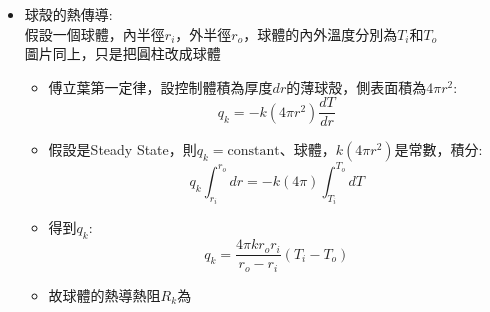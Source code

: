 \documentclass[../main.tex]{subfiles}
\begin{document}
\begin{itemize}
\begin{itemize}
\begin{itemize}
\begin{figure}
      \end{figure}
      \begin{itemize}
        \item 傅立葉第一定律，設控制體積為厚度$dr$的薄圓柱，側表面積為$2\pi rL$:
        \begin{equation}
          q_k = -k(2\pi rL)\frac{dT}{dr}
        \end{equation}
        \item 假設是Steady State，則$q_k=\text{constant}$、圓管，$k(2\pi rL)$是常數，積分:
        \begin{equation}
          q_k\int_{r_i}^{r_o} dr = -k(2\pi L)\int_{T_i}^{T_o} dT
        \end{equation}
        \item 得到$q_k$:
        \begin{equation}
          q_k = \frac{2\pi kL}{\ln\left(\frac{r_o}{r_i}\right)}\left(T_i-T_o\right)
        \end{equation}
        \item 故圓管的熱導熱阻$R_k$為
        \begin{equation}
          R_k = \frac{\ln\left(\frac{r_o}{r_i}\right)}{2\pi kL}
        \end{equation}
      \end{itemize}
      \item 球殼的熱傳導:\\
        假設一個球體，內半徑$r_i$，外半徑$r_o$，球體的內外溫度分別為$T_i$和$T_o$\\
        圖片同上，只是把圓柱改成球體
        \begin{itemize}
          \item 傅立葉第一定律，設控制體積為厚度$dr$的薄球殼，側表面積為$4\pi r^2$:
            \begin{equation}
              q_k = -k(4\pi r^2)\frac{dT}{dr}
            \end{equation}
          \item 假設是Steady State，則$q_k=\text{constant}$、球體，$k(4\pi r^2)$是常數，積分:
            \begin{equation}
              q_k\int_{r_i}^{r_o} dr = -k(4\pi)\int_{T_i}^{T_o} dT
            \end{equation}
          \item 得到$q_k$:
            \begin{equation}
              q_k = \frac{4\pi k r_or_i}{r_o-r_i}\left(T_i-T_o\right)
            \end{equation}
          \item 故球體的熱導熱阻$R_k$為

\end{itemize}
\end{itemize}
\end{itemize}
\end{itemize}
\end{document}
